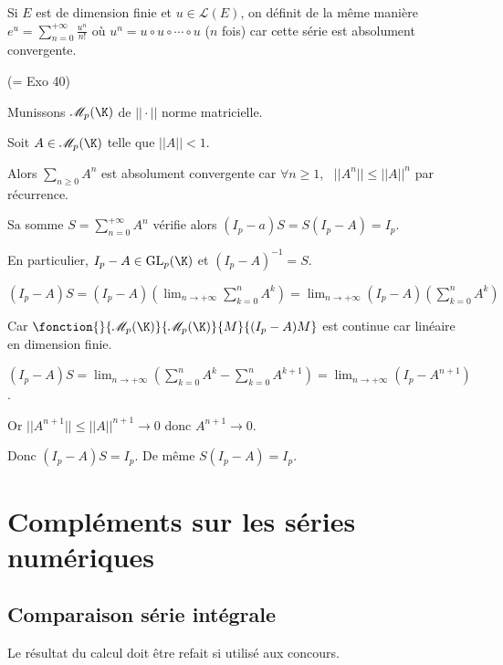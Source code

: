 \begin{remarque}
    Si $E$ est de dimension finie et $u \in \mathscr{L }(E)$, on définit de la même manière 
    $\displaystyle e^u = \sum_{n = 0}^{+\infty} \frac{u^n}{n!}$ où $u^n = u \circ u \circ \cdots \circ u$ ($n$ fois)
    car cette série est absolument convergente. 
\end{remarque}

\begin{exemple} (= Exo 40)

    Munissons $\mathscr M_p (\K)$ de $|| \cdot ||$ norme matricielle. 

    Soit $A \in \mathscr M_p(\K)$ telle que $|| A || < 1$. 

    Alors $\sum_{n \geqslant 0 } A^n$ est absolument convergente car 
    $\forall n \geqslant 1$, \, $|| A^n || \leqslant || A ||^n$ par récurrence. 

    Sa somme $\displaystyle S = \sum_{n = 0}^{+ \infty } A^n$ vérifie alors $(I_p - a ) S = S(I_p - A) = I_p$.

    En particulier, $I_p - A \in \operatorname{GL}_p (\K)$ et $(I_p - A)^{-1} = S$. 

    $\displaystyle (I_p - A)S = (I_p - A) \left(\lim_{n \to + \infty} \sum_{k = 0 }^{n } A^k \right) = \lim_{n \to + \infty} (I_p - A) \left( \sum_{k = 0}^{n } A^k \right) $

    Car $\fonction {}{\mathscr M_p(\K)}{\mathscr M_p(\K)}{M}{(I_p - A)M}$ est continue car linéaire
    en dimension finie. 

    $\displaystyle (I_p - A)S = \lim_{n \to + \infty} \left( \sum_{k = 0}^{n } A^k - \sum_{k = 0}^{n } A^{k + 1} \right) = \lim_{n \to + \infty} (I_p - A^{n + 1})$.

    Or $|| A^{n + 1} || \leqslant || A ||^{n + 1} \longrightarrow 0$ donc $A^{n + 1} \longrightarrow 0$.

    Donc $(I_p - A)S = I_p$. De même $S(I_p - A) = I_p$.

\end{exemple}

\section{Compléments sur les séries numériques}
\subsection{Comparaison série intégrale }

Le résultat du calcul doit être refait si utilisé aux concours. 

